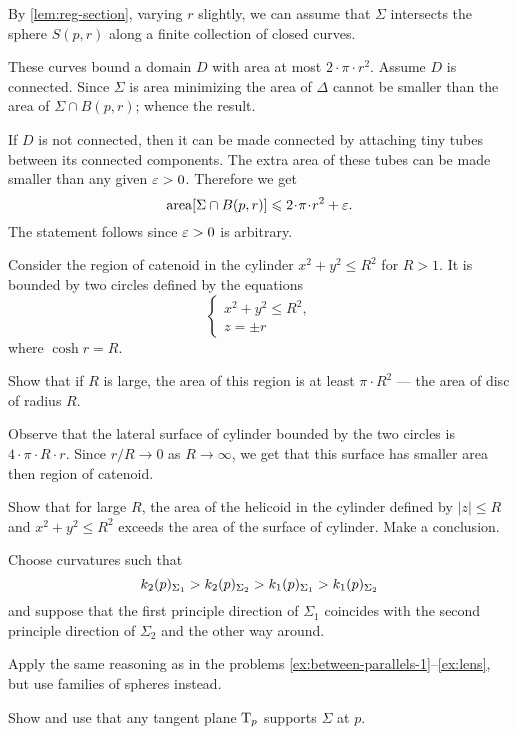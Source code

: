 By \ref{lem:reg-section}, varying $r$ slightly, we can assume that $\Sigma$ intersects the sphere $S(p,r)$ along a finite collection of closed curves.

These curves bound a domain $D$ with area at most $2\cdot \pi\cdot r^2$.
Assume $D$ is connected.
Since $\Sigma$ is area minimizing the area of $\Delta$ cannot be smaller than the area of $\Sigma\cap B(p,r)$;
whence the result.

If $D$ is not connected, then
it can be made connected by attaching tiny tubes between its connected components.
The extra area of these tubes can be made smaller than any given $\varepsilon>0$.
Therefore we get 
\[\area[\Sigma\cap B(p,r)]\le 2\cdot \pi\cdot r^2+\eps.\]
The statement follows since $\varepsilon>0$ is arbitrary.




Consider the region of catenoid in the cylinder $x^2+y^2\le R^2$ for $R>1$.
It is bounded by two circles defined by the equations 
\[
\begin{cases}
x^2+y^2\le R^2,
\\
z=\pm r
\end{cases}
\]
where $\cosh r=R$.

Show that if $R$ is large, the area of this region is at least $\pi\cdot R^2$ --- the area of disc of radius $R$.

Observe that the lateral surface of cylinder bounded by the two circles is $4\cdot \pi\cdot R\cdot r$.
Since $r/R\to 0$ as $R\to \infty$, we get that this surface has smaller area then region of catenoid.


Show that for large $R$, the area of the helicoid in the cylinder defined by $|z|\le R$ and $x^2+y^2\le R^2$ exceeds the area of the surface of cylinder.
Make a conclusion.

Choose curvatures such that 
\[k_2(p)_{\Sigma_1}\z>k_2(p)_{\Sigma_2}> k_1(p)_{\Sigma_1}> k_1(p)_{\Sigma_2}\] and suppose that the first principle direction of $\Sigma_1$ coincides with the second principle direction of $\Sigma_2$ and the other way around.

 Apply the same reasoning as in the problems \ref{ex:between-parallels-1}--\ref{ex:lens}, but use families of spheres instead.


 Show and use that any tangent plane $\mathrm{T}_p$ supports $\Sigma$ at $p$.

